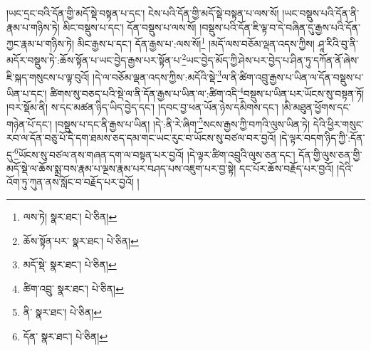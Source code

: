 །ཡང་དྲང་བའི་དོན་གྱི་མདོ་སྡེ་བསྟན་པ་དང་། ངེས་པའི་དོན་གྱི་མདོ་སྡེ་བསྟན་པ་ལས་སོ། །ཡང་བསྡུས་པའི་དོན་ནི་རྣམ་པ་གཉིས་ཏེ། མིང་བསྡུས་པ་དང་། དོན་བསྡུས་པ་ལས་སོ། །བསྡུས་པའི་དོན་ཇི་ལྟ་བ་དེ་བཞིན་དུ་རྒྱས་པའི་དོན་ཀྱང་རྣམ་པ་གཉིས་ཏེ། མིང་རྒྱས་པ་དང་། དོན་རྒྱས་པ་:ལས་སོ།\footnote{ལས་ཏེ།  སྣར་ཐང་།  པེ་ཅིན། } །མདོ་ལས་བཅོམ་ལྡན་འདས་ཀྱིས། ཤཱ་རིའི་བུ་ནི་མདོར་བསྡུས་ཏེ་:ཆོས་སྟོན་པ་ཡང་བྱེད་རྒྱས་པར་སྟོན་པ་\footnote{ཆོས་སྟོན་པར་  སྣར་ཐང་།  པེ་ཅིན། }ཡང་བྱེད་མོད་ཀྱི་ཤེས་པར་བྱེད་པ་ཤིན་ཏུ་དཀོན་ནོ་ཞེས་ཇི་སྐད་གསུངས་པ་ལྟ་བུའོ། །དེ་ལ་བཅོམ་ལྡན་འདས་ཀྱིས་:མདོའི་སྡེ་\footnote{མདོ་སྡེ་  སྣར་ཐང་།  པེ་ཅིན། }ལ་ནི་ཚིག་འབྲུ་རྒྱས་པ་ཡིན་ལ་དོན་བསྡུས་པ་ཡིན་པ་དང་། ཚིགས་སུ་བཅད་པའི་སྡེ་ལ་ནི་དོན་རྒྱས་པ་ཡིན་ལ་:ཚིག་འདི་\footnote{ཚིག་འབྲུ་  སྣར་ཐང་།  པེ་ཅིན། }བསྡུས་པ་ཡིན་པར་ཡོངས་སུ་བསྟན་ཏོ། །བར་སྡོམ་ནི། ས་དང་མཚན་ཉིད་ཡིད་བྱེད་དང་། །དབང་བྱ་ཕན་ཡོན་ཉེས་དམིགས་དང་། །མི་མཐུན་ཕྱོགས་དང་གཉེན་པོ་དང་། །བསྡུས་པ་དང་ནི་རྒྱས་པ་ཡིན། །དེ་:ནི་རེ་ཞིག་\footnote{ནི་  སྣར་ཐང་།  པེ་ཅིན། }སངས་རྒྱས་ཀྱི་བཀའི་ལུས་ཡིན་ཏེ། དེའི་ཕྱིར་གསུང་རབ་ལ་དོན་བཅུ་པོ་དེ་དག་ཐམས་ཅད་དམ་གང་ཡང་རུང་བ་ཡོངས་སུ་བཙལ་བར་བྱའོ། །དེ་ལྟར་བདག་ཉིད་ཀྱི་:དོན་དུ་\footnote{དོན་  སྣར་ཐང་།  པེ་ཅིན། }ཡོངས་སུ་བཙལ་ནས་གཞན་དག་ལ་བསྟན་པར་བྱའོ། །དེ་ལྟར་ཚིག་འབྲུའི་ལུས་ཅན་དང་། དོན་གྱི་ལུས་ཅན་གྱི་མདོ་སྡེ་ལ་ཆོས་སྨྲ་བས་རྣམ་པ་ལྔས་རྣམ་པར་བཤད་པས་འཇུག་པར་བྱ་སྟེ། དང་པོར་ཆོས་བརྗོད་པར་བྱའོ། །དེའི་འོག་ཏུ་ཀུན་ནས་སློང་བ་བརྗོད་པར་བྱའོ། །

